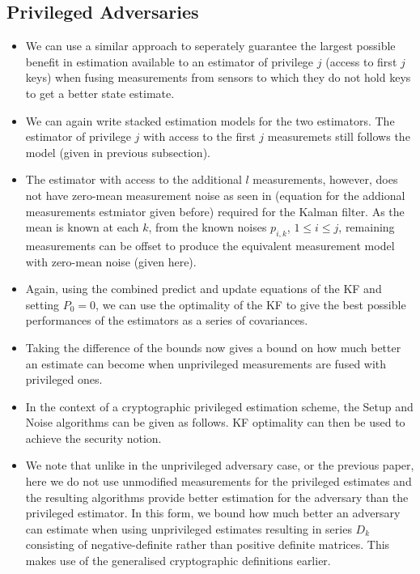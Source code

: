 \documentclass[conference]{IEEEtran}
\begin{document}
\subsection{Privileged Adversaries}\label{subsec:crypto_privileged}
\begin{itemize}
  \item We can use a similar approach to seperately guarantee the largest possible benefit in estimation available to an estimator of privilege $j$ (access to first $j$ keys) when fusing measurements from sensors to which they do not hold keys to get a better state estimate.
  \item We can again write stacked estimation models for the two estimators. The estimator of privilege $j$ with access to the first $j$ measuremets still follows the model (given in previous subsection).
  \item The estimator with access to the additional $l$ measurements, however, does not have zero-mean measurement noise as seen in (equation for the addional measurements estmiator given before) required for the Kalman filter. As the mean is known at each $k$, from the known noises $p_{i,k}$, $1\leq i \leq j$, remaining measurements can be offset to produce the equivalent measurement model with zero-mean noise (given here).
  \item Again, using the combined predict and update equations of the KF and setting $P_0=0$, we can use the optimality of the KF to give the best possible performances of the estimators as a series of covariances.
  \item Taking the difference of the bounds now gives a bound on how much better an estimate can become when unprivileged measurements are fused with privileged ones.
  \item In the context of a cryptographic privileged estimation scheme, the Setup and Noise algorithms can be given as follows. KF optimality can then be used to achieve the security notion.
  \item We note that unlike in the unprivileged adversary case, or the previous paper, here we do not use unmodified measurements for the privileged estimates and the resulting algorithms provide better estimation for the adversary than the privileged estimator. In this form, we bound how much better an adversary can estimate when using unprivileged estimates resulting in series $D_k$ consisting of negative-definite rather than positive definite matrices. This makes use of the generalised cryptographic definitions earlier.
\end{itemize}
\end{document}
